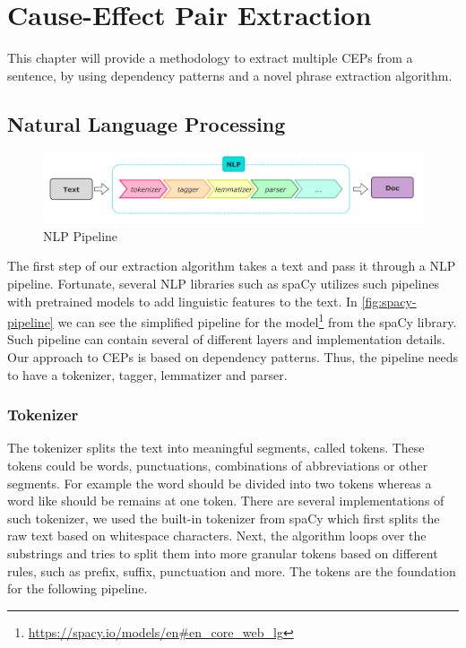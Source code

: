 \chapter{Cause-Effect Pair Extraction}\label{ch:cause-effect-extraction}
This chapter will provide a methodology to extract multiple \ac{CEP}s from a sentence, by using dependency patterns and a novel phrase extraction algorithm.


\section{Natural Language Processing}\label{sec:natural-language-processing}

\begin{figure}
    \includegraphics[width=\textwidth]{figures/cause_effect_extraction/spacy_pipeline}
    \caption{NLP Pipeline}\label{fig:spacy-pipeline}
\end{figure}

The first step of our extraction algorithm takes a text and pass it through a \ac{NLP} pipeline.
Fortunate, several NLP libraries such as spaCy utilizes such pipelines with pretrained models to add linguistic features to the text.
In \autoref{fig:spacy-pipeline} we can see the simplified pipeline for the  model\footnote{\url{https://spacy.io/models/en\#en_core_web_lg}} from the spaCy library.
Such pipeline can contain several of different layers and implementation details.
Our approach to \ac{CEP}s is based on dependency patterns.
Thus, the pipeline needs to have a tokenizer, tagger, lemmatizer and parser.

\subsection{Tokenizer}\label{subsec:tokenizer}
The tokenizer splits the text into meaningful segments, called tokens.
These tokens could be words, punctuations, combinations of abbreviations or other segments.
For example the word  should be divided into two tokens whereas a word like  should be remains at one token.
There are several implementations of such tokenizer, we used the built-in tokenizer from spaCy which first splits the raw text based on whitespace characters.
Next, the algorithm loops over the substrings and tries to split them into more granular tokens based on different rules, such as prefix, suffix, punctuation and more.
The tokens are the foundation for the following pipeline.

